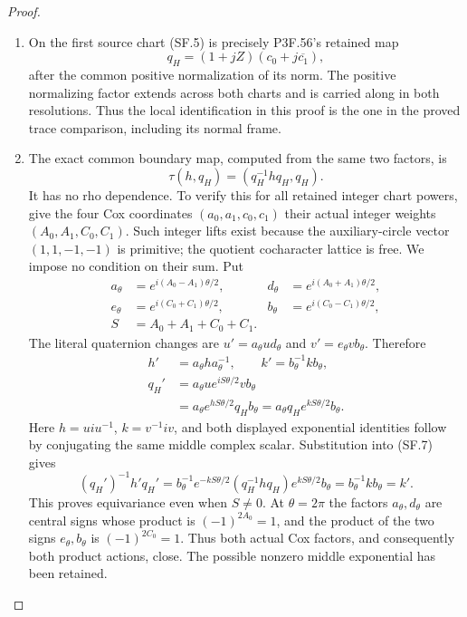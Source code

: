 \begin{proof}
\begin{enumerate}[label=\arabic*.]
\item On the first source chart (SF.5) is precisely P3F.56's retained map
\[
              q_H=(1+jZ)(c_0+j\overline{c_1}),             \tag{SF.6}
\]
after the common positive normalization of its norm. The positive
normalizing factor extends across both charts and is carried along
in both resolutions. Thus the local identification in this proof is
the one in the proved trace comparison, including its normal frame.

\item The exact common boundary map, computed from the same two factors,
is
\[
               \tau(h,q_H)=(q_H^{-1}hq_H,q_H).             \tag{SF.7}
\]
It has no rho dependence. To verify this for all retained integer
chart powers, give the four Cox coordinates \((a_0,a_1,c_0,c_1)\)
their actual integer weights \((A_0,A_1,C_0,C_1)\). Such integer
lifts exist because the auxiliary-circle vector \((1,1,-1,-1)\)
is primitive; the quotient cocharacter lattice is free. We impose
no condition on their sum. Put
\[
 \begin{aligned}
 a_\theta&=e^{i(A_0-A_1)\theta/2},&
 d_\theta&=e^{i(A_0+A_1)\theta/2},\\
 e_\theta&=e^{i(C_0+C_1)\theta/2},&
 b_\theta&=e^{i(C_0-C_1)\theta/2},\\
 S&=A_0+A_1+C_0+C_1.
 \end{aligned}
\]
The literal quaternion changes are
\(u'=a_\theta u d_\theta\) and
\(v'=e_\theta v b_\theta\). Therefore
\[
 \begin{split}
 h'&=a_\theta h a_\theta^{-1},\qquad
 k'=b_\theta^{-1}k b_\theta,\\
 q_H'&=a_\theta u e^{iS\theta/2}v b_\theta\\
     &=a_\theta e^{hS\theta/2}q_H b_\theta
       =a_\theta q_H e^{kS\theta/2}b_\theta .
 \end{split}                                             \tag{SF.8}
\]
Here \(h=u i u^{-1}\), \(k=v^{-1}iv\), and both displayed
exponential identities follow by conjugating the same middle
complex scalar. Substitution into (SF.7) gives
\[
 (q_H')^{-1}h'q_H'
 =b_\theta^{-1}e^{-kS\theta/2}
              (q_H^{-1}h q_H)e^{kS\theta/2}b_\theta
 =b_\theta^{-1}k b_\theta=k'.
\]
This proves equivariance even when \(S\ne0\). At \(\theta=2\pi\)
the factors \(a_\theta,d_\theta\) are central signs whose product
is \((-1)^{2A_0}=1\), and the product of the two signs
\(e_\theta,b_\theta\) is \((-1)^{2C_0}=1\). Thus both actual Cox
factors, and consequently both product actions, close. The possible
nonzero middle exponential has been retained.


\end{enumerate}
\end{proof}
